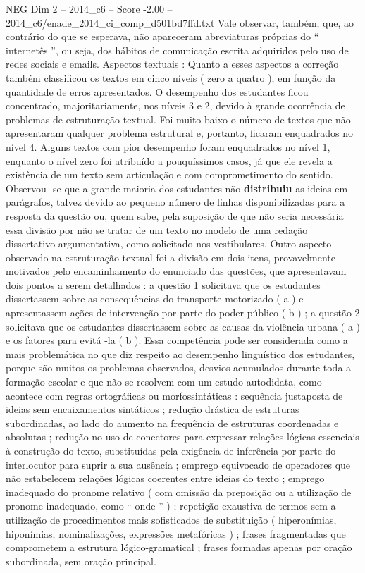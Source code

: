 \begin{textsample}{NEG Dim 2 – 2014\_c6 – Score -2.00 – 2014\_c6/enade\_2014\_ci\_comp\_d501bd7ffd.txt}
Vale observar, também, que, ao contrário do que se esperava, não apareceram abreviaturas próprias do “ internetês ”, ou seja, dos hábitos de comunicação escrita adquiridos pelo uso de redes sociais e emails.
Aspectos textuais : Quanto a esses aspectos a correção também classificou os textos em cinco níveis ( zero a quatro ), em função da quantidade de erros apresentados.
O desempenho dos estudantes ficou concentrado, majoritariamente, nos níveis 3 e 2, devido à grande ocorrência de problemas de estruturação textual.
Foi muito baixo o número de textos que não apresentaram qualquer problema estrutural e, portanto, ficaram enquadrados no nível 4.
Alguns textos com pior desempenho foram enquadrados no nível 1, enquanto o nível zero foi atribuído a pouquíssimos casos, já que ele revela a existência de um texto sem articulação e com comprometimento do sentido.
Observou -se que a grande maioria dos estudantes não \textbf{distribuiu} as ideias em parágrafos, talvez devido ao pequeno número de linhas disponibilizadas para a resposta da questão ou, quem sabe, pela suposição de que não seria necessária essa divisão por não se tratar de um texto no modelo de uma redação dissertativo-argumentativa, como solicitado nos vestibulares.
Outro aspecto observado na estruturação textual foi a divisão em dois itens, provavelmente motivados pelo encaminhamento do enunciado das questões, que apresentavam dois pontos a serem detalhados : a questão 1 solicitava que os estudantes dissertassem sobre as consequências do transporte motorizado ( a ) e apresentassem ações de intervenção por parte do poder público ( b ) ; a questão 2 solicitava que os estudantes dissertassem sobre as causas da violência urbana ( a ) e os fatores para evitá -la ( b ).
Essa competência pode ser considerada como a mais problemática no que diz respeito ao desempenho linguístico dos estudantes, porque são muitos os problemas observados, desvios acumulados durante toda a formação escolar e que não se resolvem com um estudo autodidata, como acontece com regras ortográficas ou morfossintáticas : sequência justaposta de ideias sem encaixamentos sintáticos ; redução drástica de estruturas subordinadas, ao lado do aumento na frequência de estruturas coordenadas e absolutas ; redução no uso de conectores para expressar relações lógicas essenciais à construção do texto, substituídas pela exigência de inferência por parte do interlocutor para suprir a sua ausência ; emprego equivocado de operadores que não estabelecem relações lógicas coerentes entre ideias do texto ; emprego inadequado do pronome relativo ( com omissão da preposição ou a utilização de pronome inadequado, como “ onde ” ) ; repetição exaustiva de termos sem a utilização de procedimentos mais sofisticados de substituição ( hiperonímias, hiponímias, nominalizações, expressões metafóricas ) ; frases fragmentadas que comprometem a estrutura lógico-gramatical ; frases formadas apenas por oração subordinada, sem oração principal.

\end{textsample}
